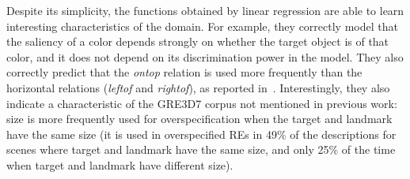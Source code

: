 Despite its simplicity, the functions obtained by linear regression are able to learn interesting 
characteristics of the domain.  For example, they correctly model that the saliency of a color depends 
strongly on whether the target object is of that color, and it does not depend on its discrimination power 
in the model.  They also correctly predict that the \emph{ontop} relation is used more frequently than 
the horizontal relations (\emph{leftof} and \emph{rightof}), as reported in~\cite{viet:gene11}. Interestingly, 
they also indicate a characteristic of the GRE3D7 corpus not mentioned in previous work: size is more 
frequently used for overspecification when the target and landmark have the same size (it is used in 
overspecified REs in 49\% of the descriptions for scenes where target and landmark have the same size, and only 25\% of the time when target and landmark have different size). %
